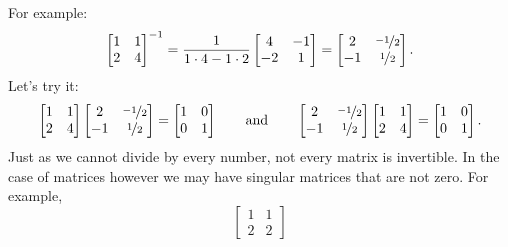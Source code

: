 \documentclass{ximera}
\begin{document}
For example:
\begin{equation*}
    \begin{bmatrix}
        1 & 1 \\
        2 & 4
    \end{bmatrix}^{-1}
    = \frac{1}{1\cdot 4-1 \cdot 2}
    \begin{bmatrix}
        4 & -1 \\
        -2 & 1
    \end{bmatrix}
    =
    \begin{bmatrix}
        2 & \nicefrac{-1}{2} \\
        -1 & \nicefrac{1}{2}
    \end{bmatrix} .
\end{equation*}
Let's try it:
\begin{equation*}
    \begin{bmatrix}
        1 & 1 \\
        2 & 4
    \end{bmatrix}
    \begin{bmatrix}
        2 & \nicefrac{-1}{2} \\
        -1 & \nicefrac{1}{2}
    \end{bmatrix}
    =
    \begin{bmatrix}
        1 & 0 \\
        0 & 1
    \end{bmatrix}
    \qquad \text{and} \qquad
    \begin{bmatrix}
        2 & \nicefrac{-1}{2} \\
        -1 & \nicefrac{1}{2}
    \end{bmatrix}
    \begin{bmatrix}
        1 & 1 \\
        2 & 4
    \end{bmatrix}
    =
    \begin{bmatrix}
        1 & 0 \\
        0 & 1
    \end{bmatrix} .
\end{equation*}
Just as we cannot divide by every number, not every matrix is invertible.  In the case of matrices however we may have singular matrices that are not zero.  For example,
\begin{equation*}
    \begin{bmatrix}
        1 & 1 \\
        2 & 2
    \end{bmatrix}
\end{equation*}
\end{document}
